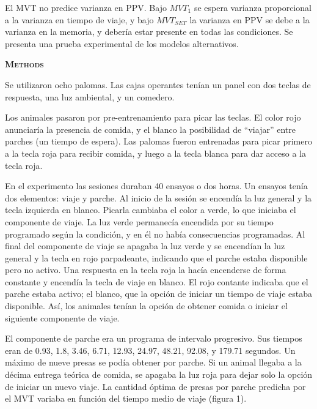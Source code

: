 \documentclass[a4paper,12pt]{article}
\begin{document}
El MVT no predice varianza en PPV. Bajo $MVT_{1}$ se espera varianza proporcional a la varianza en tiempo de viaje, y bajo $MVT_{SET}$ la varianza en PPV se debe a la varianza en la memoria, y debería estar presente en todas las condiciones. Se presenta una prueba experimental de los modelos alternativos.

{\scshape\bfseries Methods}

Se utilizaron ocho palomas. Las cajas operantes tenían un panel con dos teclas de respuesta, una luz ambiental, y un comedero.

Los animales pasaron por pre-entrenamiento para picar las teclas. El color rojo anunciaría la presencia de comida, y el blanco la posibilidad de ``viajar'' entre parches (un tiempo de espera). Las palomas fueron entrenadas para picar primero a la tecla roja para recibir comida, y luego a la tecla blanca para dar acceso a la tecla roja.

En el experimento las sesiones duraban 40 ensayos o dos horas. Un ensayos tenía dos elementos: viaje y parche. Al inicio de la sesión se encendía la luz general y la tecla izquierda en blanco. Picarla cambiaba el color a verde, lo que iniciaba el componente de viaje. La luz verde permanecía encendida por su tiempo programado según la condición, y en él no había consecuencias programadas. Al final del componente de viaje se apagaba la luz verde y se encendían la luz general y la tecla en rojo parpadeante, indicando que el parche estaba disponible pero no activo. Una respuesta en la tecla roja la hacía encenderse de forma constante y encendía la tecla de viaje en blanco. El rojo contante indicaba que el parche estaba activo; el blanco, que la opción de iniciar un tiempo de viaje estaba disponible. Así, los animales tenían la opción de obtener comida o iniciar el siguiente componente de viaje.

El componente de parche era un programa de intervalo progresivo. Sus tiempos eran de 0.93, 1.8, 3.46, 6.71, 12.93, 24.97, 48.21, 92.08, y 179.71 segundos. Un máximo de nueve presas se podía obtener por parche. Si un animal llegaba a la décima entrega teórica de comida, se apagaba la luz roja para dejar solo la opción de iniciar un nuevo viaje. La cantidad óptima de presas por parche predicha por el MVT variaba en función del tiempo medio de viaje (figura 1).
\end{document}
